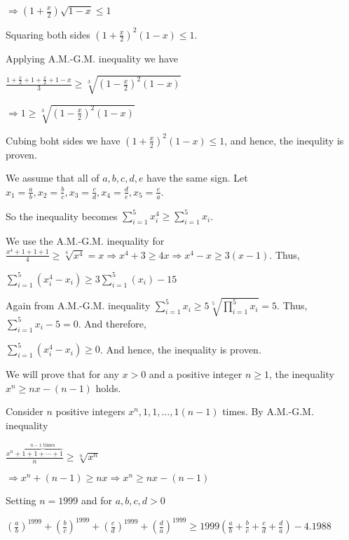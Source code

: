   $\Rightarrow \left(1 + \frac{x}{2}\right)\sqrt{1 - x}\leq 1$

  Squaring both sides $\left(1 + \frac{x}{2}\right)^2(1 - x)\leq 1$.

  Applying A.M.-G.M. inequality we have

  $\displaystyle\frac{1 + \frac{x}{2} + 1 + \frac{x}{2}+ 1 - x}{3}\geq \sqrt[3]{\left(1 -
    \frac{x}{2}\right)^2(1 - x)}$

  $\Rightarrow 1\geq \sqrt[3]{\left(1 - \frac{x}{2}\right)^2(1 - x)}$

  Cubing boht sides we have $\left(1 + \frac{x}{2}\right)^2(1 - x)\leq 1$, and hence, the inequlity is
  proven.
\item We assume that all of $a, b, c, d, e$ have the same sign. Let $x_1 = \frac{a}{b}, x_2 = \frac{b}{c},
  x_3 = \frac{c}{d}, x_4 = \frac{d}{e}, x_5 = \frac{e}{a}$.

  So the inequality becomes $\displaystyle\sum_{i=1}^5x_i^4\geq \sum_{i=1}^5x_i$.

  We use the A.M.-G.M. inequality for $\frac{x^4 + 1 + 1 + 1}{4}\geq \sqrt[4]{x^4} = x\Rightarrow x^4 + 3\geq 4x
  \Rightarrow x^4 - x\geq 3(x - 1)$. Thus,

  $\displaystyle\sum_{i = 1}^5(x_i^4 - x_i)\geq 3\sum_{i = 1}^5(x_i) - 15$

  Again from A.M.-G.M. inequality $\displaystyle\sum_{i = 1}^5x_i\geq 5\sqrt[5]{\prod_{i=1}^5x_i} =
  5$. Thus, $\displaystyle\sum_{i = 1}^5x_i - 5 = 0$. And therefore,

  $\displaystyle\sum_{i = 1}^5(x_i^4 - x_i)\geq 0$. And hence, the inequality is proven.
\item We will prove that for any $x > 0$ and a positive integer $n\geq 1$, the inequality $x^n\geq nx - (n -
  1)$ holds.

  Consider $n$ positive integers $x^n, 1, 1, \ldots, 1(n - 1)$ times. By A.M.-G.M. inequality

  $\frac{x^n + \overbrace{{1 + 1 + \cdots + 1}}^{n - 1\text{ times}}}{n}\geq \sqrt[n]{x^n}$

  $\Rightarrow x^n + (n - 1)\geq nx \Rightarrow x^n \geq nx - (n - 1)$

  Setting $n = 1999$ and for $a, b, c, d > 0$

  $\left(\frac{a}{b}\right)^{1999} + \left(\frac{b}{c}\right)^{1999} + \left(\frac{c}{d}\right)^{1999} +
  \left(\frac{d}{a}\right)^{1999}\geq 1999\left(\frac{a}{b} + \frac{b}{c} + \frac{c}{d} + \frac{d}{a}\right)
  - 4.1988$

